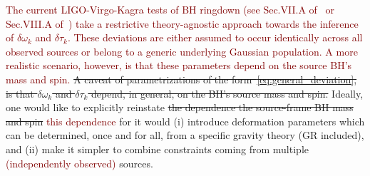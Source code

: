 \documentclass[twocolumn,
               prd,
               aps,
               superscriptaddress,
               tightenlines,
               nofootinbib,
               eqsecnum,
               amsfonts,
               amsmath,
               longbibliography]{revtex4-1}
\newcommand{\ag}[1]{{\textcolor{Maroon}{{#1}} }}
\begin{document}
\ag{The current LIGO-Virgo-Kagra tests of BH ringdown (see Sec.VII.A of~\cite{LIGOScientific:2020tif} or Sec.VIII.A of~\cite{LIGOScientific:2021sio}) take a restrictive theory-agnostic approach towards the inference of $\delta\omega_{k}$ and $\delta\tau_{k}$. These deviations are either assumed to occur identically across all observed sources or belong to a generic underlying Gaussian population. A more realistic scenario, however, is that these parameters depend on the source BH's mass and spin.}
\sout{A caveat of parametrizations of the form~\eqref{eq:general_deviation}, is that
$\delta\omega_{k}$ and $\delta\tau_{k}$ depend, in general, on the BH's source mass and spin.}
%
Ideally, one would like to explicitly reinstate \sout{the dependence the source-frame
BH mass and spin} \ag{this dependence} for it would
%
(i) introduce deformation parameters which can be determined, once and for
all, from a specific gravity theory (GR included), and
%
(ii) make it simpler to combine constraints coming from multiple \ag{(independently observed)} sources.
\end{document}
